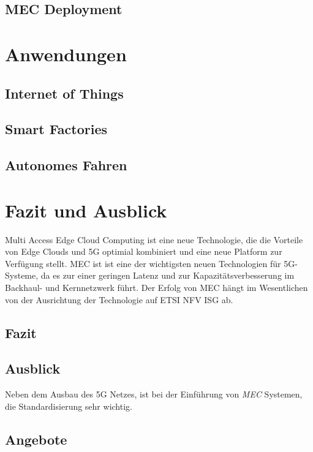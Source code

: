 \documentclass[runningheads]{llncs}
\numberwithin{figure}{section}
\begin{document}
\subsection{MEC Deployment}
\label{subsec:MEC Deployment}


\section{Anwendungen}
\label{sec:Anwendungen}
\subsection{Internet of Things}
\label{subsec:Internet of Things}
\subsection{Smart Factories}
\label{subsec:Smart Factory}
\subsection{Autonomes Fahren}
\label{subsec:Autonomes Fahren}
\section{Fazit und Ausblick}
Multi Access Edge Cloud Computing ist eine neue Technologie, die die Vorteile von
Edge Clouds und 5G optimial kombiniert und eine neue Platform zur Verfügung stellt.
MEC ist ist eine der wichtigsten neuen Technologien für 5G-Systeme, 
da es zur einer geringen Latenz und zur Kapazitätsverbesserung im Backhaul- und Kernnetzwerk führt. 
Der Erfolg von MEC hängt im Wesentlichen von der Ausrichtung der Technologie auf ETSI NFV ISG ab.
\subsection{Fazit}
\subsection{Ausblick}
Neben dem Ausbau des 5G Netzes, ist bei der Einführung von \textit{MEC} Systemen, 
die Standardisierung sehr wichtig. 
\subsection{Angebote}
\label{subsec:Angebote}
\label{sec:Ausblick}


\newpage
%
\printbibliography[heading=bibintoc]
\end{document}
